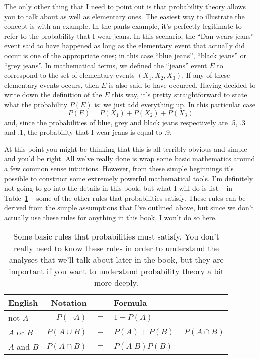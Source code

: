 The only other thing that I need to point out is that probability theory allows you to talk about  as well as elementary ones. The easiest way to illustrate the concept is with an example. In the pants example, it's perfectly legitimate to refer to the probability that I wear jeans. In this scenario, the ``Dan wears jeans'' event said to have happened as long as the elementary event that actually did occur is one of the appropriate ones; in this case ``blue jeans'', ``black jeans'' or ``grey jeans''. In mathematical terms, we defined the ``jeans'' event $E$ to correspond to the set of elementary events $(X_1, X_2, X_3)$. If any of these elementary events occurs, then $E$ is also said to have occurred. Having decided to write down the definition of the $E$ this way, it's pretty straightforward to state what the probability $P(E)$ is: we just add everything up. In this particular case
$$
P(E) = P(X_1) + P(X_2) + P(X_3)
$$ 
and, since the probabilities of blue, grey and black jeans respectively are .5, .3 and .1, the probability that I wear jeans is equal to .9. 

At this point you might be thinking that this is all terribly obvious and simple and you'd be right. All we've really done is wrap some basic mathematics around a few common sense intuitions. However, from these simple beginnings it's possible to construct some extremely powerful mathematical tools. I'm definitely not going to go into the details in this book, but what I will do is list -- in  Table~\ref{tab:probrules} -- some of the other rules that probabilities satisfy. These rules can be derived from the simple assumptions that I've outlined above, but since we don't actually use these rules for anything in this book, I won't do so here.

\begin{table}
\caption{Some basic rules that probabilities must satisfy. You don't really need to know these rules in order to understand the analyses that we'll talk about later in the book, but they are important if you want to understand probability theory a bit more deeply.}\tabcapsep
\label{tab:probrules}
\begin{center}
\begin{tabular}{lrcl}
English & Notation & & Formula \\ \hline
not $A$ & $P(\neg A)$ &$=$& $1-P(A)$ \\
$A$ or $B$ & $P(A \cup B)$ &$=$& $P(A) + P(B) - P(A \cap B)$ \\
$A$ and $B$ & $P(A \cap B)$ &$=$& $P(A|B) P(B)$ \\
\end{tabular}
\tabcapsep \HR
\end{center}
\end{table}




